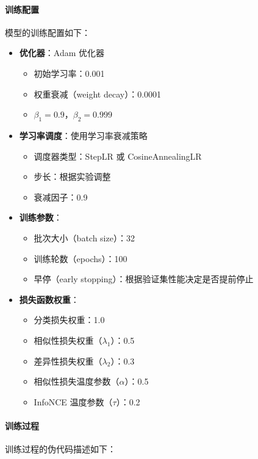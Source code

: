 \documentclass[12pt,a4paper]{article}
\begin{document}
\paragraph{训练配置}
模型的训练配置如下：

\begin{itemize}
\item \textbf{优化器}：Adam 优化器
  \begin{itemize}
  \item 初始学习率：0.001
  \item 权重衰减（weight decay）：0.0001
  \item $\beta_1 = 0.9$，$\beta_2 = 0.999$
  \end{itemize}

\item \textbf{学习率调度}：使用学习率衰减策略
  \begin{itemize}
  \item 调度器类型：StepLR 或 CosineAnnealingLR
  \item 步长：根据实验调整
  \item 衰减因子：0.9
  \end{itemize}

\item \textbf{训练参数}：
  \begin{itemize}
  \item 批次大小（batch size）：32
  \item 训练轮数（epochs）：100
  \item 早停（early stopping）：根据验证集性能决定是否提前停止
  \end{itemize}

\item \textbf{损失函数权重}：
  \begin{itemize}
  \item 分类损失权重：1.0
  \item 相似性损失权重（$\lambda_1$）：0.5
  \item 差异性损失权重（$\lambda_2$）：0.3
  \item 相似性损失温度参数（$\alpha$）：0.5
  \item InfoNCE 温度参数（$\tau$）：0.2
  \end{itemize}
\end{itemize}

\paragraph{训练过程}
训练过程的伪代码描述如下：
\end{document}

